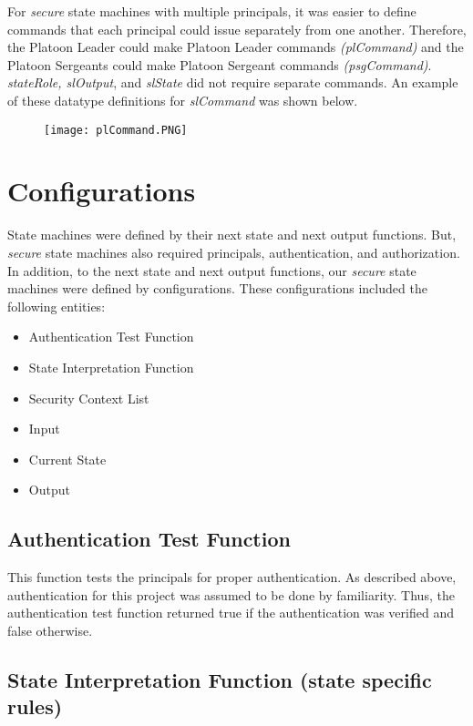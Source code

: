   For \emph{secure} state machines with multiple principals, it was easier to define commands that each principal could issue separately from one another.  Therefore, the Platoon Leader could make Platoon Leader commands \emph{(plCommand)} and the Platoon Sergeants could make Platoon Sergeant commands \emph{(psgCommand)}.  \emph{stateRole, slOutput}, and \emph{slState} did not require separate commands.  An example of these datatype definitions for \emph{slCommand} was shown below.  
  
  \begin{figure}[h]
  \centering
  \texttt{[image: plCommand.PNG]}
\end{figure}



\section{Configurations}
\label{sec:configurations}

State machines were defined by their next state and next output functions.  But, \emph{secure} state machines also required principals, authentication, and authorization.  In addition, to the next state and next output functions, our \emph{secure} state machines were defined by configurations.  These configurations included the following entities:
\begin{itemize}
\item Authentication Test Function
\item State Interpretation Function
\item Security Context List
\item Input
\item Current State
\item Output\\
  \end{itemize}
  
\subsection{Authentication Test Function}
\label{sec:auth-test-funct}

This function tests the principals for proper authentication.  As described above, authentication for this project was assumed to be done by familiarity.  Thus, the authentication test function returned true if the authentication was verified and false otherwise.  
  
\subsection{State Interpretation Function (state specific rules)}
\label{sec:state-interpr-funct}

